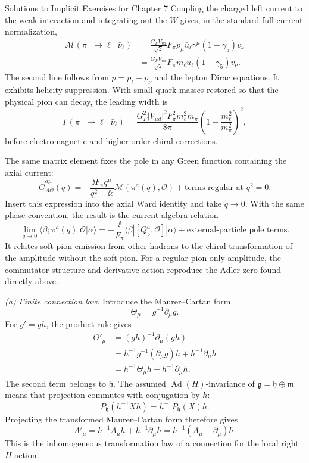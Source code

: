 \begin{bankssolutions}{Solutions to Implicit Exercises for Chapter 7}
Coupling the charged left current to the weak interaction and integrating
out the $W$ gives, in the standard full-current normalization,
\begin{align*}
 \mathcal M(\pi^-\to\ell^-\bar\nu_\ell)
 &=\frac{G_FV_{ud}}{\sqrt2}F_\pi p_\mu
 \bar u_\ell\gamma^\mu(1-\gamma_5)v_\nu\\
 &=\frac{G_FV_{ud}}{\sqrt2}F_\pi m_\ell
 \bar u_\ell(1-\gamma_5)v_\nu.
\end{align*}
The second line follows from $p=p_\ell+p_\nu$ and the lepton Dirac
equations.  It exhibits helicity suppression.  With small quark masses
restored so that the physical pion can decay, the leading width is
\[
 \Gamma(\pi^-\to\ell^-\bar\nu_\ell)
 =\frac{G_F^2|V_{ud}|^2F_\pi^2m_\ell^2m_\pi}{8\pi}
 \left(1-\frac{m_\ell^2}{m_\pi^2}\right)^2,
\]
before electromagnetic and higher-order chiral corrections.

The same matrix element fixes the pole in any Green function containing the
axial current:
\[
 \widetilde G_{A\mathcal O}^{a\mu}(q)
 =-\frac{\ii F_\pi q^\mu}{q^2-\ii\epsilon}
 \mathcal M(\pi^a(q),\mathcal O)+\text{terms regular at }q^2=0.
\]
Insert this expression into the axial Ward identity and take $q\to0$.  With
the same phase convention, the result is the current-algebra relation
\[
 \lim_{q\to0}\langle\beta;\pi^a(q)|\mathcal O|\alpha\rangle
 =-\frac{\ii}{F_\pi}
 \langle\beta|[Q_5^a,\mathcal O]|\alpha\rangle
 +\text{external-particle pole terms}.
\]
It relates soft-pion emission from other hadrons to the chiral transformation
of the amplitude without the soft pion.  For a regular pion-only amplitude,
the commutator structure and derivative action reproduce the Adler zero
found directly above.

\textit{(a) Finite connection law.}
Introduce the Maurer--Cartan form
\[
 \Theta_\mu=g^{-1}\partial_\mu g.
\]
For $g'=gh$, the product rule gives
\begin{align*}
 \Theta'_\mu
 &=(gh)^{-1}\partial_\mu(gh)\\
 &=h^{-1}g^{-1}(\partial_\mu g)h+h^{-1}\partial_\mu h\\
 &=h^{-1}\Theta_\mu h+h^{-1}\partial_\mu h.
\end{align*}
The second term belongs to $\mathfrak h$.  The assumed
$\operatorname{Ad}(H)$-invariance of
$\mathfrak g=\mathfrak h\oplus\mathfrak m$ means that projection commutes
with conjugation by $h$:
\[
 P_{\mathfrak h}(h^{-1}Xh)=h^{-1}P_{\mathfrak h}(X)h.
\]
Projecting the transformed Maurer--Cartan form therefore gives
\begin{equation*}
 \boxed{A'_\mu=h^{-1}A_\mu h+h^{-1}\partial_\mu h
 =h^{-1}(A_\mu+\partial_\mu)h.}
\end{equation*}
This is the inhomogeneous transformation law of a connection for the local
right $H$ action.


\end{bankssolutions}
